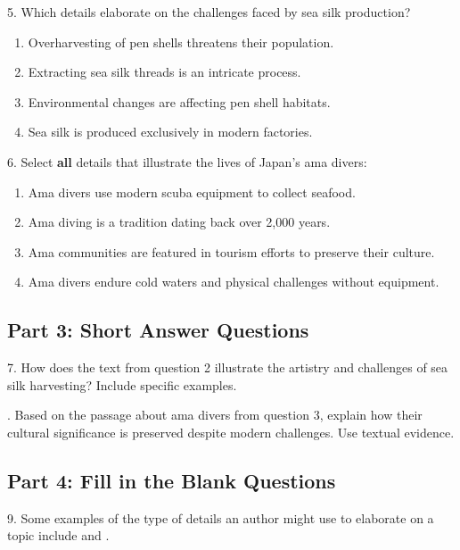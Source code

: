 \documentclass[12pt]{article}
\begin{document}
\vspace{1cm}

5. Which details elaborate on the challenges faced by sea silk production?  
\begin{enumerate}[label=\Alph*.]
    \item Overharvesting of pen shells threatens their population.  
    \item Extracting sea silk threads is an intricate process.  
    \item Environmental changes are affecting pen shell habitats.  
    \item Sea silk is produced exclusively in modern factories.  
\end{enumerate}

\vspace{1cm}

6. Select \textbf{all} details that illustrate the lives of Japan’s ama divers:  
\begin{enumerate}[label=\Alph*.]
    \item Ama divers use modern scuba equipment to collect seafood.  
    \item Ama diving is a tradition dating back over 2,000 years.  
    \item Ama communities are featured in tourism efforts to preserve their culture.  
    \item Ama divers endure cold waters and physical challenges without equipment.  
\end{enumerate}

\vspace{1em}

\subsection*{Part 3: Short Answer Questions}

7. How does the text from question 2 illustrate the artistry and challenges of sea \\silk harvesting? Include specific examples.  
\vspace{4cm}

. Based on the passage about ama divers from question 3, explain how their \\cultural significance is preserved despite modern challenges. Use textual evidence.  
\vspace{4cm}

\subsection*{Part 4: Fill in the Blank Questions}
\vspace{1cm}
9. Some examples of the type of details an author might use to elaborate on a \\topic include \underline{\hspace{4cm}} and \underline{\hspace{4cm}} .
\vspace{2cm}
\end{document}
